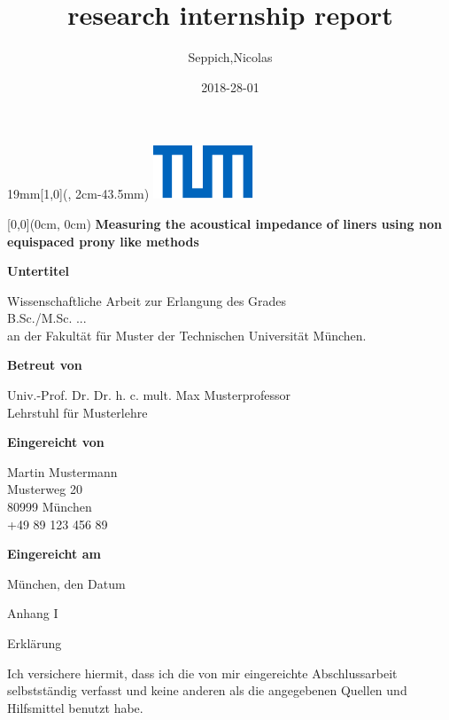 \documentclass[11pt]{report} %
\title{research internship report}
\date{2018-28-01}
\author{Seppich,Nicolas}
\newcommand{\SeitenrandOben}{43.5mm}
\newcommand{\UniversitaetLogoBreite}{19mm}
\newcommand{\Titel}{Measuring the acoustical impedance of liners using non equispaced prony like methods  }
\newcommand{\Untertitel}{%
    Untertitel}
\newcommand{\Grad}{%
    B.Sc./M.Sc. ...}
\newcommand{\Fakultaet}{%
    Fakultät für Muster}
\newcommand{\BetreutVonPerson}{%
    Univ.-Prof. Dr. Dr. h. c. mult. Max Musterprofessor}
\newcommand{\BetreutVonLehrstuhl}{%
    Lehrstuhl für Musterlehre}
\newcommand{\EingereichtVon}{%
    Martin Mustermann\\
    Musterweg 20\\
    80999 München\\
    +49 89 123 456 89}
\newcommand{\ErklaerungUeberschrift}{%
    Anhang I}
\newcommand{\Datum}{%
    Datum}
\begin{document}
\begin{textblock*}{\UniversitaetLogoBreite}[1,0](\textwidth-1mm, 2cm-\SeitenrandOben)%
    \raggedleft\includegraphics{./Deckblatt/Ressourcen/Universitaet_Logo_RGB.pdf}%
\end{textblock*}


\begin{textblock*}{\textwidth}[0,0](0cm, 0cm)%
{\fontsize{24pt}{26pt}\selectfont\textbf{\Titel}}

\vspace*{14pt}
{\fontsize{18pt}{27pt}\selectfont\textbf{\Untertitel}}
\end{textblock*}

\vspace*{92.2mm}
\fontsize{15pt}{17.5pt}\selectfont%
Wissenschaftliche Arbeit zur Erlangung des Grades\\
\Grad\\
an der \Fakultaet{} der Technischen Universität München.

\renewcommand{\baselinestretch}{1.47}
\normalsize\selectfont
\vspace*{17.1mm}
\textbf{Betreut von}\tab
\begin{minipage}[t]{\textwidth-\CurrentLineWidth}
\BetreutVonPerson\\
\BetreutVonLehrstuhl\strut
\end{minipage}

\vspace*{4.3mm}
\textbf{Eingereicht von}\tab
\begin{minipage}[t]{\textwidth-\CurrentLineWidth}
\EingereichtVon
\end{minipage}

\vspace*{-1mm}
\textbf{Eingereicht am}\tab 
\begin{minipage}[t]{\textwidth-\CurrentLineWidth}
München, den \Datum\strut
\end{minipage}

\newpage

\vspace*{-15.8mm}
\fontsize{19pt}{21pt}\selectfont
\ErklaerungUeberschrift

\vspace{25.3mm}
Erklärung

\normalsize\selectfont
\vspace{13.2mm}
Ich versichere hiermit, dass ich die von mir eingereichte Abschlussarbeit selbstständig verfasst und keine anderen als die angegebenen Quellen und Hilfsmittel benutzt habe.
\end{document}
